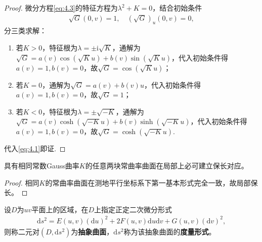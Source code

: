 \documentclass[../../main.tex]{subfiles}%
\begin{document}
\begin{proof}

微分方程\eqref{eq:4.3}的特征方程为$\lambda^2+K=0$，结合初始条件
\begin{align}
\sqrt{G}(0,v)=1,\quad (\sqrt{G})_u(0,v)=0,\label{eq:4.4}
\end{align}
分三类求解：
\begin{enumerate}[(1)]
\item 若$K>0$，特征根为$\lambda=\pm\mathrm{i}\sqrt{K}$，通解为$\sqrt{G}=a(v)\cos(\sqrt{K}u)+b(v)\sin(\sqrt{K}u)$，代入初始条件得$a(v)=1,b(v)=0$，故$\sqrt{G}=\cos(\sqrt{K}u)$；
\item 若$K=0$，通解为$\sqrt{G}=a(v)+b(v)u$，代入初始条件得$a(v)=1,b(v)=0$，故$\sqrt{G}=1$；
\item 若$K<0$，特征根为$\lambda=\pm\sqrt{-K}$，通解为$\sqrt{G}=a(v)\cosh(\sqrt{-K}u)+b(v)\sinh(\sqrt{-K}u)$，代入初始条件得$a(v)=1,b(v)=0$，故$\sqrt{G}=\cosh(\sqrt{-K}u)$.
\end{enumerate}
代入\eqref{eq:4.1}即证.

\end{proof}

\begin{theorem}
具有相同常数Gauss曲率$K$的任意两块常曲率曲面在局部上必可建立保长对应。
\end{theorem}

\begin{proof}

相同$K$的常曲率曲面在测地平行坐标系下第一基本形式完全一致，故局部保长。

\end{proof}

\begin{definition}
设$D$为$uv$平面上的区域，在$D$上指定正定二次微分形式
\begin{align}
\mathrm{d}s^2=E(u,v)(\mathrm{d}u)^2+2F(u,v)\mathrm{d}u\mathrm{d}v+G(u,v)(\mathrm{d}v)^2,\label{eq:4.5}
\end{align}
则称二元对$(D,\mathrm{d}s^2)$为\textbf{抽象曲面}，$\mathrm{d}s^2$称为该抽象曲面的\textbf{度量形式}。
\end{definition}
\end{document}
